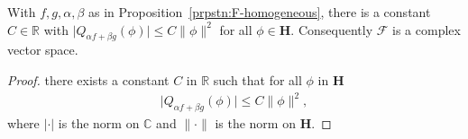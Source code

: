 \begin{proposition}
    \label{prpstn:F-bounded}
    \leanok
    With $f,g,\alpha,\beta$ as in Proposition~\ref{prpstn:F-homogeneous}, there is a constant $C \in \mathbb{R}$ with $\lvert Q_{\alpha f + \beta g}(\phi) \rvert \le C \|\phi\|^2$ for all $\phi \in \mathbf{H}$. Consequently $\mathcal{F}$ is a complex vector space.
\end{proposition}
\begin{proof}
    \leanok
there exists a constant $C$ in $\mathbb{R}$ such that for all $\phi$ in $\mathbf{H}$
\begin{align}
    \lvert Q_{\alpha f + \beta g}(\phi) \rvert \le C \|\phi\|^2,
\end{align}
where $\lvert \cdot \rvert$ is the norm on $\mathbb{C}$ and $\|\cdot\|$ is the norm on $\mathbf{H}$. 


\end{proof}
